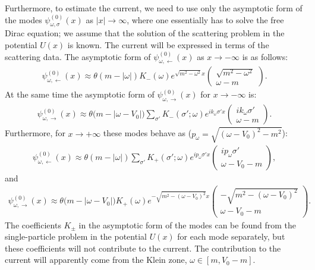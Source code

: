 \documentclass[12pt]{article}
\numberwithin{equation}{section}
\begin{document}
Furthermore, to estimate the current, we need to use only the asymptotic form of the modes $\mathit{\psi}^{(0)}_{\omega,\sigma}(x)$ as $|x|\rightarrow\infty$, where one essentially has to solve the free Dirac equation; we assume that the solution of the scattering problem in the potential $U(x)$ is known. %
The current will be expressed in terms of the scattering data.
The asymptotic form of  $\mathit{\psi}^{(0)}_{\omega,\leftarrow}(x)$ as $x\rightarrow -\infty$ is as follows:
\begin{gather}
\mathit{\psi}^{(0)}_{\omega,\leftarrow}(x)\approx\theta(m-|\omega|)K_{-}(\omega)e^{\sqrt{m^2-\omega^2}x}\begin{pmatrix}
		\sqrt{m^2-\omega^2}\\
		\omega-m
	\end{pmatrix}.
\end{gather}
At the same time the asymptotic form of $\mathit{\psi}^{(0)}_{\omega,\rightarrow}(x)$ for $x\rightarrow -\infty$ is:
\begin{gather}
\mathit{\psi}^{(0)}_{\omega,\rightarrow}(x)\approx\theta\Big(m-|\omega-V_0|\Big)\sum_{\sigma'}K_{-}(\sigma';\omega)e^{ik_\omega\sigma'x}\begin{pmatrix}
		ik_\omega\sigma'\\
		\omega-m
	\end{pmatrix}.
\end{gather}
Furthermore, for $x\rightarrow +\infty$ these modes behave as ($p_\omega = \sqrt{(\omega-V_0)^2-m^2}$):
\begin{gather}
\mathit{\psi}^{(0)}_{\omega,\leftarrow}(x)\approx\theta(m-|\omega|)\sum_{\sigma'}K_{+}(\sigma';\omega)e^{ip_\omega\sigma'x}\begin{pmatrix}
		ip_\omega\sigma'\\
		\omega-V_0-m
	\end{pmatrix},
\end{gather}
and 
\begin{gather}
\mathit{\psi}^{(0)}_{\omega,\rightarrow}(x)\approx\theta\Big(m-|\omega-V_0|\Big)K_{+}(\omega)e^{-\sqrt{m^2-(\omega-V_0)^2}x}\begin{pmatrix}
		-\sqrt{m^2-(\omega-V_0)^2}\\
		\omega-V_0-m
	\end{pmatrix}.
\end{gather}
The coefficients $K_{\pm}$ in the asymptotic form of the modes can be found from the single-particle problem in the potential $U(x)$ for each mode separately, but these coefficients will not contribute to the current. The contribution to the current will apparently come from the Klein zone, $\omega \in [m, V_0 - m]$.
\end{document}
